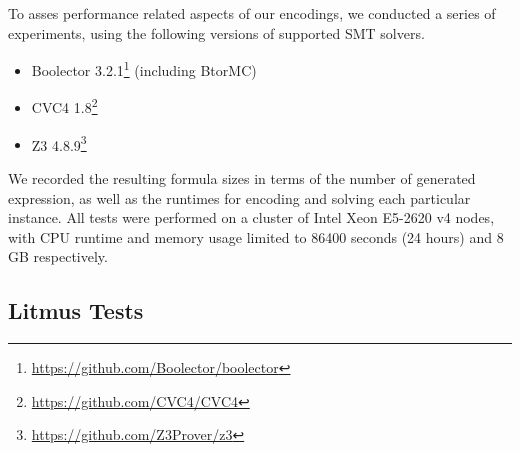 To asses performance related aspects of our encodings,
we conducted a series of experiments, using the following versions of supported SMT solvers.
%
%
%
%
%
\begin{itemize}
  \item Boolector 3.2.1\footnote{\url{https://github.com/Boolector/boolector}} (including BtorMC)
  \item CVC4 1.8\footnote{\url{https://github.com/CVC4/CVC4}}
  \item Z3 4.8.9\footnote{\url{https://github.com/Z3Prover/z3}}
\end{itemize}
%

We recorded the resulting formula sizes in terms of the number of generated expression, as well as the runtimes for encoding and solving each particular instance.
All tests were performed on a cluster of Intel Xeon\textsuperscript{\textregistered} E5-2620 v4 nodes, with CPU runtime and memory usage limited to 86400 seconds (24 hours) and 8 GB respectively.


\subsection*{Litmus Tests}

